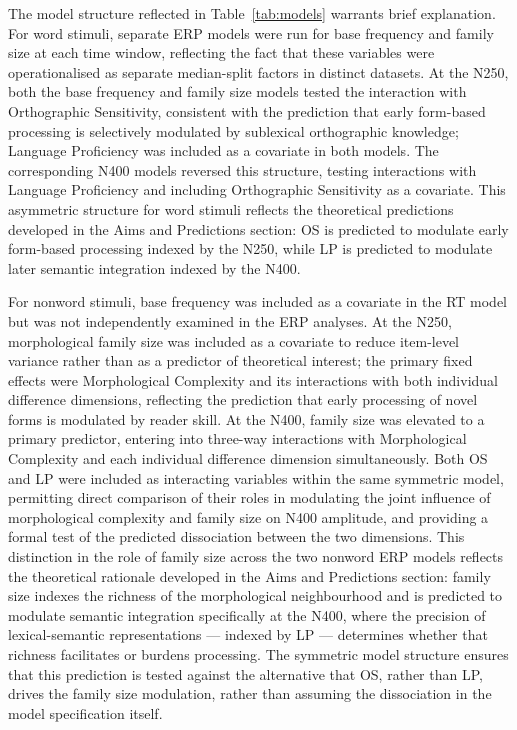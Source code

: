 \documentclass[utf8]{FrontiersinHarvard} %
\begin{document}
	The model structure reflected in Table~\ref{tab:models} warrants brief explanation. For word stimuli, separate ERP models were run for base frequency and family size at each time window, reflecting the fact that these variables were operationalised as separate median-split factors in distinct datasets. At the N250, both the base frequency and family size models tested the interaction with Orthographic Sensitivity, consistent with the prediction that early form-based processing is selectively modulated by sublexical orthographic knowledge; Language Proficiency was included as a covariate in both models. The corresponding N400 models reversed this structure, testing interactions with Language Proficiency and including Orthographic Sensitivity as a covariate. This asymmetric structure for word stimuli reflects the theoretical predictions developed in the Aims and Predictions section: OS is predicted to modulate early form-based processing indexed by the N250, while LP is predicted to modulate later semantic integration indexed by the N400.
	
	For nonword stimuli, base frequency was included as a covariate in the RT model but was not independently examined in the ERP analyses. At the N250, morphological family size was included as a covariate to reduce item-level variance rather than as a predictor of theoretical interest; the primary fixed effects were Morphological Complexity and its interactions with both individual difference dimensions, reflecting the prediction that early processing of novel forms is modulated by reader skill. At the N400, family size was elevated to a primary predictor, entering into three-way interactions with Morphological Complexity and each individual difference dimension simultaneously. Both OS and LP were included as interacting variables within the same symmetric model, permitting direct comparison of their roles in modulating the joint influence of morphological complexity and family size on N400 amplitude, and providing a formal test of the predicted dissociation between the two dimensions. This distinction in the role of family size across the two nonword ERP models reflects the theoretical rationale developed in the Aims and Predictions section: family size indexes the richness of the morphological neighbourhood and is predicted to modulate semantic integration specifically at the N400, where the precision of lexical-semantic representations --- indexed by LP --- determines whether that richness facilitates or burdens processing. The symmetric model structure ensures that this prediction is tested against the alternative that OS, rather than LP, drives the family size modulation, rather than assuming the dissociation in the model specification itself.
	
\end{document}
